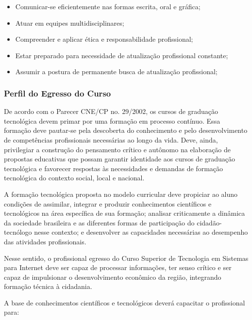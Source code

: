 \begin{itemize}
\item Comunicar-se eficientemente nas formas escrita, oral e gráfica;
\item Atuar em equipes multidisciplinares;
\item Compreender e aplicar ética e responsabilidade profissional;
\item Estar preparado para necessidade de atualização profissional constante;
\item Assumir a postura de permanente busca de atualização profissional;
\end{itemize}

\subsubsection{Perfil do Egresso do Curso}

De acordo com o Parecer CNE/CP no. 29/2002, os cursos de graduação tecnológica devem primar por uma formação em processo contínuo. Essa formação deve pautar-se pela descoberta do conhecimento e pelo desenvolvimento de competências profissionais necessárias ao longo da vida. Deve, ainda, privilegiar a construção do pensamento crítico e autônomo na elaboração de propostas educativas que possam garantir identidade aos cursos de graduação tecnológica e favorecer respostas às necessidades e demandas de formação tecnológica do contexto social, local e nacional.

A formação tecnológica proposta no modelo curricular deve propiciar ao aluno condições de assimilar, integrar e produzir conhecimentos científicos e tecnológicos na área específica de sua formação; analisar criticamente a dinâmica da sociedade brasileira e as diferentes formas de participação do cidadão-tecnólogo nesse contexto; e desenvolver as capacidades necessárias ao desempenho das atividades profissionais.

Nesse sentido, o profissional egresso do Curso Superior de Tecnologia em Sistemas para Internet deve ser capaz de processar informações, ter senso crítico e ser capaz de impulsionar o desenvolvimento econômico da região, integrando formação técnica à cidadania.

A base de conhecimentos científicos e tecnológicos deverá capacitar o profissional para:

